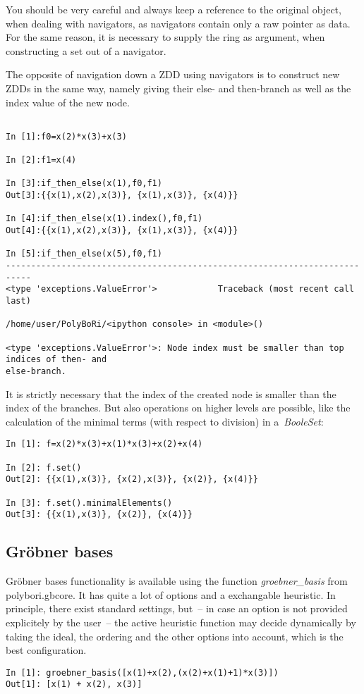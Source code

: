 \documentclass[]{article}
\newcommand{\Groebner}{Gr\"{o}bner\xspace}
\newcommand{\functionname}[1]{\textit{#1}\xspace}
\begin{document}
You should be very careful and always keep a reference to the original object, when dealing with navigators, as navigators contain only a raw pointer as data.
For the same reason, it is necessary to supply the ring as argument, when constructing a set out of a navigator.

The opposite of navigation down a ZDD using navigators is to construct new ZDDs in the same way, namely giving their else- and then-branch as well as the index value of the new node.

\begin{lstlisting}
    
In [1]:f0=x(2)*x(3)+x(3)

In [2]:f1=x(4)

In [3]:if_then_else(x(1),f0,f1)
Out[3]:{{x(1),x(2),x(3)}, {x(1),x(3)}, {x(4)}}

In [4]:if_then_else(x(1).index(),f0,f1)
Out[4]:{{x(1),x(2),x(3)}, {x(1),x(3)}, {x(4)}}

In [5]:if_then_else(x(5),f0,f1)
---------------------------------------------------------------------------
<type 'exceptions.ValueError'>            Traceback (most recent call last)

/home/user/PolyBoRi/<ipython console> in <module>()

<type 'exceptions.ValueError'>: Node index must be smaller than top indices of then- and
else-branch.
\end{lstlisting}

It is strictly necessary that the index of the created node is smaller than the index of the branches.
%
%
But also operations on higher levels are possible, like the calculation of the minimal terms (with respect to division) in a~\functionname{BooleSet}:
\begin{lstlisting}
In [1]: f=x(2)*x(3)+x(1)*x(3)+x(2)+x(4)

In [2]: f.set()
Out[2]: {{x(1),x(3)}, {x(2),x(3)}, {x(2)}, {x(4)}}

In [3]: f.set().minimalElements()
Out[3]: {{x(1),x(3)}, {x(2)}, {x(4)}}
\end{lstlisting}
\subsection{\Groebner bases}
\Groebner bases functionality is available using the function \functionname{groebner\_basis} from polybori.gbcore.
It has quite a lot of options and a exchangable heuristic.
In principle, there exist  standard settings, but~-- in case an option is not
provided explicitely by the user~-- the active heuristic function
may decide dynamically by taking the ideal, the ordering and the other options into account, which is the best configuration.
\begin{lstlisting}
In [1]: groebner_basis([x(1)+x(2),(x(2)+x(1)+1)*x(3)])
Out[1]: [x(1) + x(2), x(3)]
\end{lstlisting}
\end{document}
